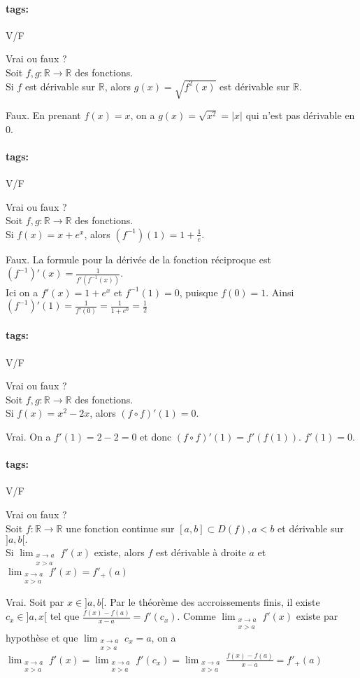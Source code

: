 \documentclass[12pt]{article}
\newcommand*{\xfield}[1]{\begin{mdframed}\centering #1\end{mdframed}\bigskip}
\newenvironment{note}{}{}
\newcommand*{\tags}[1]{\paragraph{tags: }#1}
\begin{document}
\begin{note}
\tags{V/F}
	\xfield{Vrai ou faux ?\\
	Soit $f,g: \mathbb{R} \to \mathbb{R}$ des fonctions.\\
	Si $f$ est dérivable sur $\mathbb{R}$, alors $g(x) = \sqrt{f^2(x)}$ est dérivable sur $\mathbb{R}$.}
	\xfield{Faux. En prenant $f(x) = x$, on a $g(x) = \sqrt{x^2} = \vert x \vert$ qui n'est pas dérivable en 0.}
\end{note}

\begin{note}
\tags{V/F}
	\xfield{Vrai ou faux ?\\
	Soit $f,g: \mathbb{R} \to \mathbb{R}$ des fonctions.\\
	Si $f(x) = x + e^x$, alors $(f^{-1})(1) = 1 + \frac{1}{e}$.}
	\xfield{Faux. La formule pour la dérivée de la fonction réciproque est $(f^{-1})'(x) = \frac{1}{f'(f^{-1}(x))}$.\\
	Ici on a $f'(x) = 1 + e^x$ et $f^{-1}(1) = 0$, puisque $f(0) = 1$. Ainsi \\
	$(f^{-1})'(1) = \frac{1}{f'(0)} = \frac{1}{1 + e^0} = \frac{1}{2}$}
\end{note}

\begin{note}
\tags{V/F}
	\xfield{Vrai ou faux ?\\
	Soit $f,g: \mathbb{R} \to \mathbb{R}$ des fonctions.\\
	Si $f(x) = x^2 - 2x$, alors $(f\circ f)'(1) = 0$.}
	\xfield{Vrai. On a $f'(1) = 2 -2 = 0$ et donc $(f\circ f)'(1) = f'(f(1))$. $f'(1)=0$.}
\end{note}

\begin{note}
\tags{V/F}
	\xfield{Vrai ou faux ?\\
	Soit $f: \mathbb{R} \to \mathbb{R}$ une fonction continue sur $[a,b] \subset D(f), a<b$ et dérivable sur $]a,b[.$\\
	Si $\lim_{\substack{x\to a\\ x>a}} f'(x)$ existe, alors $f$ est dérivable à droite $a$ et $\lim_{\substack{x\to a\\ x>a}} f'(x) = f'_+(a)$}
	\xfield{Vrai. Soit par $x\in ]a,b[$. Par le théorème des accroissements finis, il existe $c_x \in ]a,x[$ tel que $\frac{f(x)-f(a)}{x-a} = f'(c_x)$. Comme $\lim_{\substack{x\to a\\ x>a}} f'(x)$ existe par hypothèse et que $\lim_{\substack{x\to a\\ x>a}} c_x = a$, on a\\
	$\lim_{\substack{x\to a\\ x>a}} f'(x) = \lim_{\substack{x\to a\\ x>a}} f'(c_x) = \lim_{\substack{x\to a\\ x>a}} \frac{f(x)-f(a)}{x-a} = f'_+(a)$}
\end{note}
\end{document}
